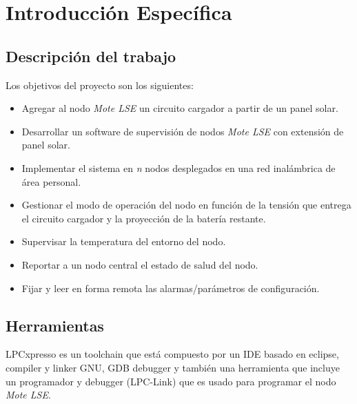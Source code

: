 \chapter{Introducción Específica} %

\label{Chapter2}


\section{Descripción del trabajo}
\label{sec:trabajo}
\noindent Los objetivos del proyecto son los siguientes:

\begin{itemize}
	\item Agregar al nodo \textit{Mote LSE} un circuito cargador a partir de un panel solar.
	\item Desarrollar un software de supervisión de nodos \textit{Mote LSE} con extensión de panel solar.
	\item Implementar el sistema en \textit{n} nodos desplegados en una red inalámbrica de área personal.
	\item Gestionar el modo de operación del nodo en función de la tensión que entrega el circuito cargador y la proyección de la batería restante.
	\item Supervisar la temperatura del entorno del nodo.
	\item Reportar a un nodo central el estado de salud del nodo.
	\item Fijar y leer en forma remota las alarmas/parámetros de configuración.
	\end{itemize}

\section{Herramientas}
\label{sec:herramientas}

LPCxpresso es un toolchain que está compuesto por un IDE basado en eclipse, compiler y linker GNU, GDB debugger y también una herramienta que incluye un programador y debugger (LPC-Link) que es usado para programar el nodo \textit{Mote LSE}.


